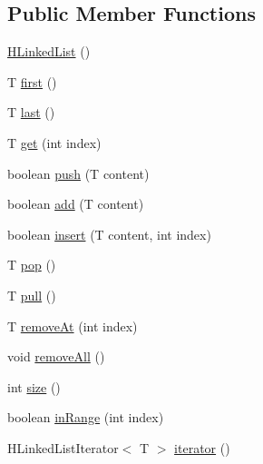 \subsection*{Public Member Functions}
\begin{DoxyCompactItemize}
\item 
\hyperlink{classhype_1_1collection_1_1_h_linked_list_3_01_t_01_4_a14b2415fa85e79a73612a830b2be1183}{H\-Linked\-List} ()
\item 
T \hyperlink{classhype_1_1collection_1_1_h_linked_list_3_01_t_01_4_aacf87cdc782d5a414f9c1ef8d09a0c42}{first} ()
\item 
T \hyperlink{classhype_1_1collection_1_1_h_linked_list_3_01_t_01_4_a42e5d4c31d86bea273fcc2325aac921e}{last} ()
\item 
T \hyperlink{classhype_1_1collection_1_1_h_linked_list_3_01_t_01_4_a0c9adfd9f2c124f68ab4783b56c0db03}{get} (int index)
\item 
boolean \hyperlink{classhype_1_1collection_1_1_h_linked_list_3_01_t_01_4_aca3396e6dc0fd46ab6f6bc9295a31aa8}{push} (T content)
\item 
boolean \hyperlink{classhype_1_1collection_1_1_h_linked_list_3_01_t_01_4_a28bc4de7d42542e13204921e5238ab2e}{add} (T content)
\item 
boolean \hyperlink{classhype_1_1collection_1_1_h_linked_list_3_01_t_01_4_ae9669bc4efddcf2777d263671b2d0b62}{insert} (T content, int index)
\item 
T \hyperlink{classhype_1_1collection_1_1_h_linked_list_3_01_t_01_4_aba376c6c79dd78bc1a98c7582d68c3cc}{pop} ()
\item 
T \hyperlink{classhype_1_1collection_1_1_h_linked_list_3_01_t_01_4_a0b13ff35e17f05c062ade5f5dc20aae0}{pull} ()
\item 
T \hyperlink{classhype_1_1collection_1_1_h_linked_list_3_01_t_01_4_a2ced2552bcb8dbcb22b04ddfc95bf3d4}{remove\-At} (int index)
\item 
void \hyperlink{classhype_1_1collection_1_1_h_linked_list_3_01_t_01_4_afedfcd7b830164544cdd80f775cc1477}{remove\-All} ()
\item 
int \hyperlink{classhype_1_1collection_1_1_h_linked_list_3_01_t_01_4_aade26db170bf22eeca79dfcd73d44b67}{size} ()
\item 
boolean \hyperlink{classhype_1_1collection_1_1_h_linked_list_3_01_t_01_4_a4ec40f06cf449af3f2f8d01246b18340}{in\-Range} (int index)
\item 
H\-Linked\-List\-Iterator$<$ T $>$ \hyperlink{classhype_1_1collection_1_1_h_linked_list_3_01_t_01_4_a8bca0ca083ec7d62b0ec98cfe00c1461}{iterator} ()
\end{DoxyCompactItemize}
